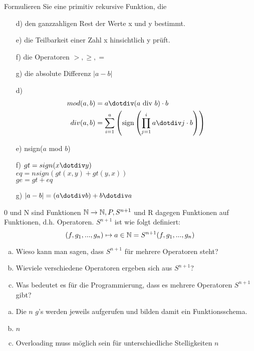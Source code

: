 \begin{card}
  Formulieren Sie eine primitiv rekursive Funktion, die
  \begin{enumerate}
    \item[d)] den ganzzahligen Rest der Werte x und y bestimmt.
    \item[e)] die Teilbarkeit einer Zahl x hinsichtlich y prüft.
    \item[f)] die Operatoren $>, \geq, =$
    \item[g)] die absolute Differenz $|a - b|$
	\end{enumerate}
	\hr
  \begin{enumerate}
    \item[d)]
      \begin{align*}
        mod(a, b) &= a \dotdiv (a \text{ div } b) \cdot b \\
        div(a, b) &= \sum\limits_{i=1}^a \lrk \text{sign} \lrk \prod\limits_{j=1}^i a \dotdiv j \cdot b \rrk \rrk
      \end{align*}
    \item[e)] nsign($a$ mod $b$)
    \item[f)] $gt = sign(x \dotdiv y)$ \\
              $eq = nsign(gt(x, y) + gt(y,x))$ \\
              $ge = gt + eq$
            \item[g)] $|a - b| = (a \dotdiv b) + b \dotdiv a$ \\
	\end{enumerate}
\end{card}

\begin{card}
  0 und N sind Funktionen $\mathbb{N} \rightarrow \mathbb{N}, P, S^{n+1}$ und R dagegen
  Funktionen auf Funktionen, d.h. Operatoren. $S^{n+1}$ ist wie folgt definiert:
  \[
    (f, g_1,..., g_n) \mapsto a \in \mathbb{N} = S^{n+1}(f, g_1,..., g_n)
  \]

  \begin{enumerate}[a)]
    \item Wieso kann man sagen, dass $S^{n+1}$ für mehrere Operatoren steht?
    \item Wieviele verschiedene Operatoren ergeben sich aus $S^{n+1}$?
    \item Was bedeutet es für die Programmierung, dass es mehrere Operatoren $S^{n+1} $ gibt?
  \end{enumerate}
  \hr
  \begin{enumerate}[a)]
    \item Die $n$ $g$'s werden jeweils aufgerufen und bilden damit ein Funktionsschema.
    \item $n$
    \item Overloading muss möglich sein für unterschiedliche Stelligkeiten $n$
  \end{enumerate}
\end{card}

